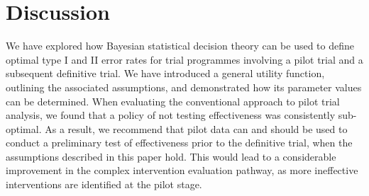 \documentclass[sagev, Crown]{sagej} %
\begin{document}




\section{Discussion}\label{sec:discussion}

We have explored how Bayesian statistical decision theory can be used to define optimal type I and II error rates for trial programmes involving a pilot trial and a subsequent definitive trial. We have introduced a general utility function, outlining the associated assumptions, and demonstrated how its parameter values can be determined. When evaluating the conventional approach to pilot trial analysis, we found that a policy of not testing effectiveness was consistently sub-optimal. As a result, we recommend that pilot data can and should be used to conduct a preliminary test of effectiveness prior to the definitive trial, when the assumptions described in this paper hold. This would lead to a considerable improvement in the complex intervention evaluation pathway, as more ineffective interventions are identified at the pilot stage.
\end{document}
